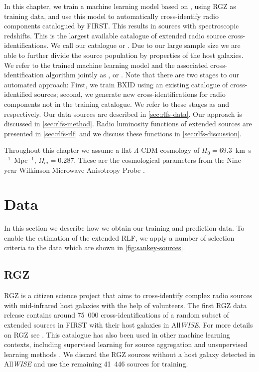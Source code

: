 In this chapter, we train a machine learning model based on \citet{alger18radio}, using RGZ as training data, and
use this model to automatically cross-identify \ncomponents{} radio components catalogued by FIRST. This results in \nsourceszsp{} sources
with spectroscopic redshifts. This is the largest available catalogue of
extended radio source cross-identifications. We call our catalogue
 or . Due to our large sample size we are able to further divide the
source population by properties of the host galaxies. We refer to the trained machine learning model and the associated cross-identification algorithm jointly as , or . Note that there are two stages to our automated approach: First, we train BXID using an existing catalogue of cross-identified sources; second, we generate new cross-identifications for radio components not in the training catalogue. We refer to these stages as  and  respectively. Our data sources are described in \autoref{sec:rlfs-data}. Our approach is discussed in \autoref{sec:rlfs-method}. Radio luminosity functions of extended sources are presented in \autoref{sec:rlfs-rlf} and we discuss these functions in \autoref{sec:rlfs-discussion}.

Throughout this chapter we assume a flat $\Lambda$-CDM cosmology of \linebreak $H_0 =
69.3$~km~s$^{-1}$~Mpc$^{-1}$, $\Omega_m = 0.287$. These are the cosmological
parameters from the Nine-year Wilkinson Microwave Anisotropy Probe
\citep[WMAP9;][]{hinshaw13wmap9}.

\section{Data} \label{sec:rlfs-data}

In this section we describe how we obtain our training and prediction data. To enable the estimation of the extended RLF, we apply a number of selection criteria to the data which are shown in \autoref{fig:sankey-sources}.

    \subsection{RGZ} \label{sec:rlfs-rgz-data}

    RGZ is a citizen science project that aims to cross-identify complex radio sources with mid-infrared host galaxies with the help of volunteers. The first RGZ data release contains around 75~000 cross-identifications of a random subset of extended sources in FIRST with their host galaxies in All\emph{WISE}. For more details on RGZ see \citet{banfield15}. This catalogue has also been used in other machine learning contexts, including supervised learning for source aggregation \citep{wu19claran} and unsupervised learning methods \citep{galvin19som,ralph19ae}. We discard the RGZ sources without a host galaxy detected in All\emph{WISE} and use the remaining 41~446 sources for training.

